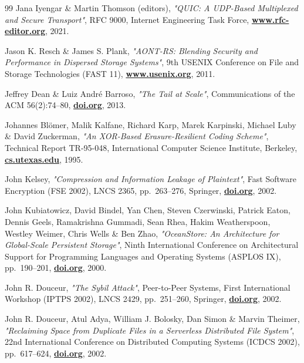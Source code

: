\documentclass[10pt,a4paper,final]{article}
\let\oldhref\href
\renewcommand{\href}[2]{\oldhref{#1}{\bfseries#2}}
\begin{document}
\begin{thebibliography}{99}
	Jana Iyengar \& Martin Thomson (editors),
	\emph{"QUIC: A UDP-Based Multiplexed and Secure Transport"},
	RFC 9000, Internet Engineering Task Force,
	\href{https://www.rfc-editor.org/rfc/rfc9000}{www.rfc-editor.org},
	2021.

	Jason K. Resch \& James S. Plank,
	\emph{"AONT-RS: Blending Security and Performance in Dispersed Storage Systems"},
	9th USENIX Conference on File and Storage Technologies (FAST 11),
	\href{https://www.usenix.org/conference/fast11/aont-rs-blending-security-and-performance-dispersed-storage-systems}{www.usenix.org},
	2011.

	Jeffrey Dean \& Luiz Andr\'{e} Barroso,
	\emph{"The Tail at Scale"},
	Communications of the ACM 56(2):74--80,
	\href{https://doi.org/10.1145/2408776.2408794}{doi.org},
	2013.

	Johannes Bl\"{o}mer, Malik Kalfane, Richard Karp, Marek Karpinski, Michael Luby \& David Zuckerman,
	\emph{"An XOR-Based Erasure-Resilient Coding Scheme"},
	Technical Report TR-95-048, International Computer Science Institute, Berkeley,
	\href{https://cs.utexas.edu/~diz/Sub\%20Websites/Research/An_XOR_based_erasure_resilient_coding_scheme.pdf}{cs.utexas.edu},
	1995.

	John Kelsey,
	\emph{"Compression and Information Leakage of Plaintext"},
	Fast Software Encryption (FSE 2002), LNCS 2365, pp.~263--276, Springer,
	\href{https://doi.org/10.1007/3-540-45661-9_21}{doi.org},
	2002.

	John Kubiatowicz, David Bindel, Yan Chen, Steven Czerwinski, Patrick Eaton, Dennis Geels, Ramakrishna Gummadi, Sean Rhea, Hakim Weatherspoon, Westley Weimer, Chris Wells \& Ben Zhao,
	\emph{"OceanStore: An Architecture for Global-Scale Persistent Storage"},
	Ninth International Conference on Architectural Support for Programming Languages and Operating Systems (ASPLOS IX), pp.~190--201,
	\href{https://doi.org/10.1145/378993.379239}{doi.org},
	2000.

	John R. Douceur,
	\emph{"The Sybil Attack"},
	Peer-to-Peer Systems, First International Workshop (IPTPS 2002), LNCS 2429, pp.~251--260, Springer,
	\href{https://doi.org/10.1007/3-540-45748-8_24}{doi.org},
	2002.

	John R. Douceur, Atul Adya, William J. Bolosky, Dan Simon \& Marvin Theimer,
	\emph{"Reclaiming Space from Duplicate Files in a Serverless Distributed File System"},
	22nd International Conference on Distributed Computing Systems (ICDCS 2002), pp.~617--624,
	\href{https://doi.org/10.1109/ICDCS.2002.1022312}{doi.org},
	2002.


\end{thebibliography}
\end{document}
